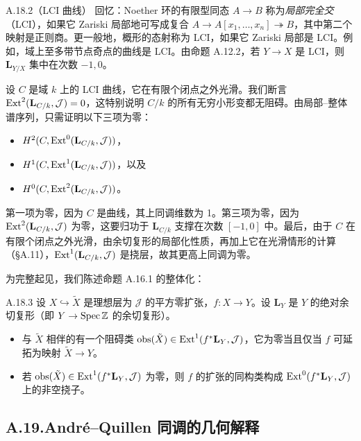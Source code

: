 \begin{exam}{A.18.2（LCI 曲线）}\label{thm:a6-08-12}
回忆：Noether 环的有限型同态 $A\to B$ 称为\emph{局部完全交}（LCI），如果它 Zariski 局部地可写成复合 $A\to A[x_1,\dots,x_n]\twoheadrightarrow B$，其中第二个映射是正则商。更一般地，概形的态射称为 LCI，如果它 Zariski 局部是 LCI。例如，域上至多带节点奇点的曲线是 LCI。由命题 A.12.2，若 $Y\to X$ 是 LCI，则 $\mathbf L_{Y/X}$ 集中在次数 $-1,0$。

设 $C$ 是域 $k$ 上的 LCI 曲线，它在有限个闭点之外光滑。我们断言 $\operatorname{Ext}^2(\mathbf L_{C/k},\mathcal J)=0$，这特别说明 $C/k$ 的所有无穷小形变都无阻碍。由局部--整体谱序列，只需证明以下三项为零：
\begin{itemize}
\item $H^2(C,\operatorname{Ext}^0(\mathbf L_{C/k},\mathcal J))$，
\item $H^1(C,\operatorname{Ext}^1(\mathbf L_{C/k},\mathcal J))$，以及
\item $H^0(C,\operatorname{Ext}^2(\mathbf L_{C/k},\mathcal J))$。
\end{itemize}
第一项为零，因为 $C$ 是曲线，其上同调维数为 1。第三项为零，因为 $\operatorname{Ext}^2(\mathbf L_{C/k},\mathcal J)$ 为零，这要归功于 $\mathbf L_{C/k}$ 支撑在次数 $[-1,0]$ 中。最后，由于 $C$ 在有限个闭点之外光滑，由余切复形的局部化性质，再加上它在光滑情形的计算（§A.11），$\operatorname{Ext}^1(\mathbf L_{C/k},\mathcal J)$ 是挠层，故其更高上同调为零。
\end{exam}

为完整起见，我们陈述命题 A.16.1 的整体化：

\begin{prop}{A.18.3}\label{thm:a6-08-13}
设 $X\hookrightarrow\tilde X$ 是理想层为 $\mathcal J$ 的平方零扩张，$f\colon X\to Y$。设 $\mathbf L_Y$ 是 $Y$ 的绝对余切复形（即 $Y\to\operatorname{Spec}\mathbb{Z}$ 的余切复形）。
\begin{itemize}
\item 与 $\tilde X$ 相伴的有一个阻碍类 $\mathrm{obs}(\tilde X)\in\operatorname{Ext}^1(f^*\mathbf L_Y,\mathcal J)$，它为零当且仅当 $f$ 可延拓为映射 $\tilde X\to Y$。
\item 若 $\mathrm{obs}(\tilde X)\in\operatorname{Ext}^1(f^*\mathbf L_Y,\mathcal J)$ 为零，则 $f$ 的扩张的同构类构成 $\operatorname{Ext}^0(f^*\mathbf L_Y,\mathcal J)$ 上的非空挠子。
\end{itemize}
\end{prop}


\subsection*{A.19.\quad André--Quillen 同调的几何解释}


